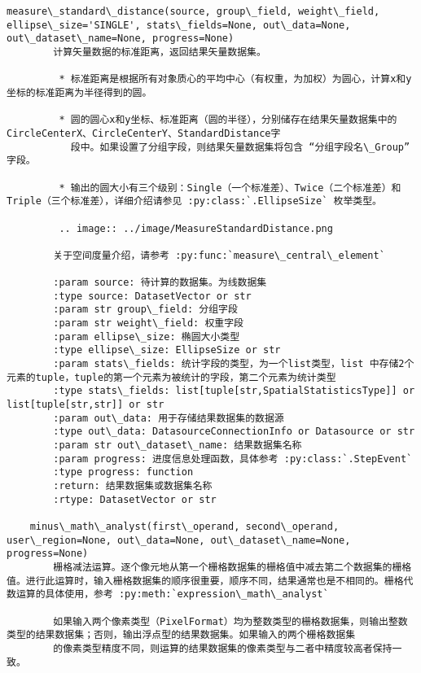 \documentclass[11pt]{article}
\begin{document}
\begin{Verbatim}[commandchars=\\\{\}]
    measure\_standard\_distance(source, group\_field, weight\_field, ellipse\_size='SINGLE', stats\_fields=None, out\_data=None, out\_dataset\_name=None, progress=None)
        计算矢量数据的标准距离，返回结果矢量数据集。
        
         * 标准距离是根据所有对象质心的平均中心（有权重，为加权）为圆心，计算x和y坐标的标准距离为半径得到的圆。
        
         * 圆的圆心x和y坐标、标准距离（圆的半径），分别储存在结果矢量数据集中的CircleCenterX、CircleCenterY、StandardDistance字
           段中。如果设置了分组字段，则结果矢量数据集将包含 “分组字段名\_Group” 字段。
        
         * 输出的圆大小有三个级别：Single（一个标准差）、Twice（二个标准差）和Triple（三个标准差），详细介绍请参见 :py:class:`.EllipseSize` 枚举类型。
        
         .. image:: ../image/MeasureStandardDistance.png
        
        关于空间度量介绍，请参考 :py:func:`measure\_central\_element`
        
        :param source: 待计算的数据集。为线数据集
        :type source: DatasetVector or str
        :param str group\_field: 分组字段
        :param str weight\_field: 权重字段
        :param ellipse\_size: 椭圆大小类型
        :type ellipse\_size: EllipseSize or str
        :param stats\_fields: 统计字段的类型，为一个list类型，list 中存储2个元素的tuple，tuple的第一个元素为被统计的字段，第二个元素为统计类型
        :type stats\_fields: list[tuple[str,SpatialStatisticsType]] or list[tuple[str,str]] or str
        :param out\_data: 用于存储结果数据集的数据源
        :type out\_data: DatasourceConnectionInfo or Datasource or str
        :param str out\_dataset\_name: 结果数据集名称
        :param progress: 进度信息处理函数，具体参考 :py:class:`.StepEvent`
        :type progress: function
        :return: 结果数据集或数据集名称
        :rtype: DatasetVector or str
    
    minus\_math\_analyst(first\_operand, second\_operand, user\_region=None, out\_data=None, out\_dataset\_name=None, progress=None)
        栅格减法运算。逐个像元地从第一个栅格数据集的栅格值中减去第二个数据集的栅格值。进行此运算时，输入栅格数据集的顺序很重要，顺序不同，结果通常也是不相同的。栅格代数运算的具体使用，参考 :py:meth:`expression\_math\_analyst`
        
        如果输入两个像素类型（PixelFormat）均为整数类型的栅格数据集，则输出整数类型的结果数据集；否则，输出浮点型的结果数据集。如果输入的两个栅格数据集
        的像素类型精度不同，则运算的结果数据集的像素类型与二者中精度较高者保持一致。
        

\end{Verbatim}
\end{document}
